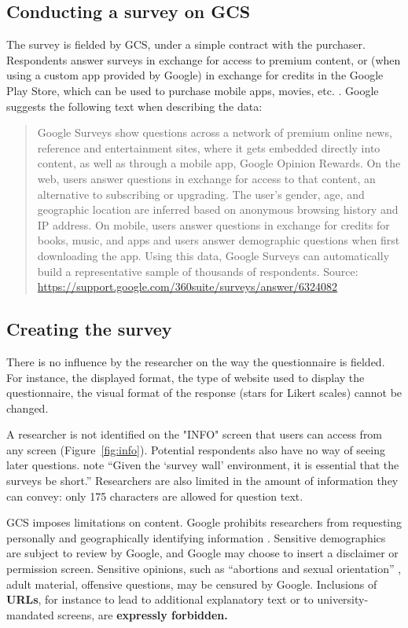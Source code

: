 
\subsection{Conducting a survey on GCS}
\label{sec:conducting}

The survey is fielded by \acf{GCS}, under a simple contract with the purchaser. Respondents answer surveys in exchange for access to premium content, or (when using a custom app provided by Google) in exchange for credits in the Google Play Store, which can be used to purchase mobile apps, movies, etc. \citep{Google_Inc2016-fj}. Google suggests the following text when describing the data:
\begin{quotation}
	Google Surveys show questions across a network of premium online news, reference and entertainment sites, where it gets embedded directly into content, as well as through a mobile app, Google Opinion Rewards. On the web, users answer questions in exchange for access to that content, an alternative to subscribing or upgrading. The user's gender, age, and geographic location are inferred based on anonymous browsing history and IP address. On mobile, users answer questions in exchange for credits for books, music, and apps and users answer demographic questions when first downloading the app. Using this data, Google Surveys can automatically build a representative sample of thousands of respondents.
	{\footnotesize{Source: \url{https://support.google.com/360suite/surveys/answer/6324082}}}
\end{quotation}

\subsection{Creating the survey}
There is no influence by the researcher on the way the questionnaire is fielded. For instance, the displayed format, the type of website used to display the questionnaire, the visual format of the response (stars for Likert scales) cannot be changed. 

A researcher is not identified on the "INFO" screen that users can access from any screen (Figure~\ref{fig:info}). Potential respondents also have no way of seeing later questions.  \cite{doi:10.1093/pan/mpw016} note ``Given the  `survey wall' environment, it is essential that the surveys be short.''  Researchers are also limited in the amount of information they can convey: only 175 characters are allowed for question text.

\ac{GCS} imposes limitations on content. Google prohibits researchers from requesting personally and geographically identifying information \citep{Google_Inc2017-wi}. Sensitive demographics are subject to review by Google, and Google may choose to insert a disclaimer or permission screen. Sensitive opinions, such as ``abortions and sexual orientation'' \citep{Google_Inc2017-wi}, adult material, offensive questions,  may be censured by Google. 
Inclusions of \textbf{URLs}, for instance to lead to additional explanatory text or to university-mandated screens,  are \textbf{expressly forbidden.} 

